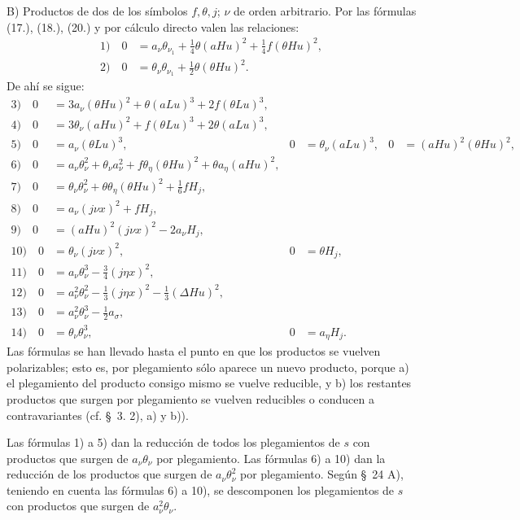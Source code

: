 \documentclass[11pt]{article}
\newcommand{\D}{\Delta}
\begin{document}
B) Productos de dos de los símbolos $f,\theta,j$; $\nu$ de orden arbitrario. Por las fórmulas (17.), (18.), (20.) y por cálculo directo valen las relaciones:
\begin{align*}
1)\quad 0&=a_\nu\theta_{\nu_1}+\frac14\theta(aHu)^2+\frac14f(\theta Hu)^2,\\
2)\quad 0&=\theta_\nu\theta_{\nu_1}+\frac12\theta(\theta Hu)^2.
\end{align*}
De ahí se sigue:
\begin{align*}
3)\quad 0&=3a_\nu(\theta Hu)^2+\theta(aLu)^3+2f(\theta Lu)^3,\\
4)\quad 0&=3\theta_\nu(aHu)^2+f(\theta Lu)^3+2\theta(aLu)^3,\\
5)\quad 0&=a_\nu(\theta Lu)^3,
&0&=\theta_\nu(aLu)^3,
&0&=(aHu)^2(\theta Hu)^2,\\
6)\quad 0&=a_\nu\theta_\nu^2+\theta_\nu a_\nu^2+f\theta_\eta(\theta Hu)^2+\theta a_\eta(aHu)^2,\\
7)\quad 0&=\theta_\nu\theta_\nu^2+\theta\theta_\eta(\theta Hu)^2+\frac16fH_j,\\
8)\quad 0&=a_\nu(j\nu x)^2+fH_j,\\
9)\quad 0&=(aHu)^2(j\nu x)^2-2a_\nu H_j,\\
10)\quad 0&=\theta_\nu(j\nu x)^2,
&0&=\theta H_j,\\
11)\quad 0&=a_\nu\theta_\nu^3-\frac34(j\eta x)^2,\\
12)\quad 0&=a_\nu^2\theta_\nu^2-\frac13(j\eta x)^2-\frac13(\D Hu)^2,\\
13)\quad 0&=a_\nu^2\theta_\nu^3-\frac12a_\sigma,\\
14)\quad 0&=\theta_\nu\theta_\nu^3,
&0&=a_\eta H_j.
\end{align*}
Las fórmulas se han llevado hasta el punto en que los productos se vuelven polarizables; esto es, por plegamiento sólo aparece un nuevo producto, porque a) el plegamiento del producto consigo mismo se vuelve reducible, y b) los restantes productos que surgen por plegamiento se vuelven reducibles o conducen a contravariantes (cf. \S\ 3. 2), a) y b)).

Las fórmulas 1) a 5) dan la reducción de todos los plegamientos de $s$ con productos que surgen de $a_\nu\theta_\nu$ por plegamiento. Las fórmulas 6) a 10) dan la reducción de los productos que surgen de $a_\nu\theta_\nu^2$ por plegamiento. Según \S\ 24 A), teniendo en cuenta las fórmulas 6) a 10), se descomponen los plegamientos de $s$ con productos que surgen de $a_\nu^2\theta_\nu$.
\end{document}
